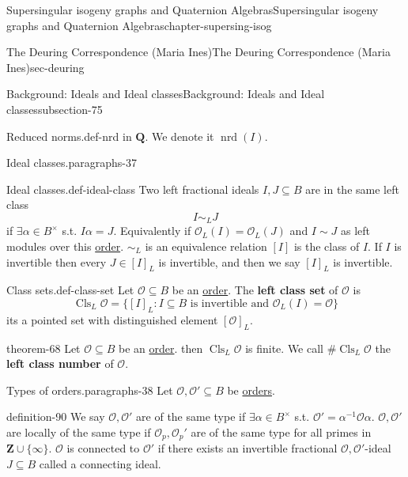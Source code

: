 \documentclass[oneside,10pt,]{book}
\newcommand{\terminology}[1]{\textbf{#1}}
\numberwithin{equation}{section}
\newcommand{\inv}{^{-1}}
\newcommand{\lb}{[}
\newcommand{\rb}{]}
\newcommand{\ZZ}{\mathbf{Z}}
\newcommand{\QQ}{\mathbf{Q}}
\newcommand{\ints}{\mathcal{O}}
\begin{document}
\begin{chapterptx}{Supersingular isogeny graphs and Quaternion Algebras}{}{Supersingular isogeny graphs and Quaternion Algebras}{}{}{chapter-supersing-isog}
\begin{sectionptx}{The Deuring Correspondence (Maria Ines)}{}{The Deuring Correspondence (Maria Ines)}{}{}{sec-deuring}
\begin{subsectionptx}{Background: Ideals and Ideal classes}{}{Background: Ideals and Ideal classes}{}{}{subsection-75}
\begin{definition}{Reduced norms.}{def-nrd}
in \(\QQ\). We denote it \(\operatorname{nrd}(I)\).%
\end{definition}
\begin{paragraphs}{Ideal classes.}{paragraphs-37}%
\begin{definition}{Ideal classes.}{def-ideal-class}%
\hypertarget{p-945}{}%
Two left fractional ideals \(I,J \subseteq B\) are in the same left class%
\begin{equation*}
I\sim_L J
\end{equation*}
if \(\exists  \alpha \in B^\times\) s.t. \(I\alpha = J\). Equivalently if \(\ints_L(I)  = \ints_L(J)\) and \(I \sim J\) as left modules over this \hyperref[def-order-quaternion]{order}. \(\sim_L\) is an equivalence relation \(\lb I \rb\) is the class of \(I\). If \(I \) is invertible then every \(J \in \lb I \rb_L\) is invertible, and then we say \(\lb I \rb_L \) is invertible.%
\end{definition}
\begin{definition}{Class sets.}{def-class-set}%
\hypertarget{p-946}{}%
Let \(\ints \subseteq B\) be an \hyperref[def-order-quaternion]{order}. The \terminology{left class set} of \(\ints\) is%
\begin{equation*}
\operatorname{Cls}_L \ints   = \{ \lb I \rb_L : I \subseteq B \text{ is invertible  and } \ints_L(I) = \ints\}
\end{equation*}
its a pointed set with distinguished element \(\lb \ints \rb_L\).%
\end{definition}
\begin{theorem}{}{}{theorem-68}%
\hypertarget{p-947}{}%
Let \(\ints \subseteq B\) be an \hyperref[def-order-quaternion]{order}. then \(\operatorname{Cls} _L \ints\) is finite. We call \(\# \operatorname{Cls}_L\ints \) the \terminology{left class number} of \(\ints\).%
\end{theorem}
\end{paragraphs}%
\begin{paragraphs}{Types of orders.}{paragraphs-38}%
\hypertarget{p-948}{}%
Let \(\ints ,\ints'  \subseteq B\) be \hyperref[def-order-quaternion]{orders}.%
\begin{definition}{}{definition-90}%
\hypertarget{p-949}{}%
We say \(\ints,\ints' \) are of the same type if \(\exists \alpha \in B^\times\) s.t. \(\ints ' = \alpha \inv \ints \alpha\). \(\ints,\ints'\) are locally of the same type if \(\ints_p, \ints_p'\) are of the same type for all primes in \(\ZZ\cup\{\infty\}\). \(\ints\) is connected to  \(\ints'\) if there exists an invertible fractional \(\ints,\ints'\)-ideal \(J \subseteq B\) called a connecting ideal.%

\end{definition}
\end{paragraphs}
\end{subsectionptx}
\end{sectionptx}
\end{chapterptx}
\end{document}
